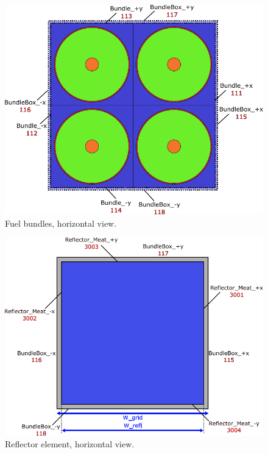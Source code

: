 \documentclass{UWNR_modeling}
\begin{document}
\newpage
\appendix
\begin{figure}[H]
  \centering
  \includegraphics[width=5in]{bundle_xy.pdf}
  \caption{Fuel bundles, horizontal view.}
  \label{fig:bundle_xy}
\end{figure}
\begin{figure}[H]
  \centering
  \includegraphics[width=5in]{Refl_xy.pdf}
  \caption{Reflector element, horizontal view.}
  \label{fig:Refl_xy}
\end{figure}
\end{document}
